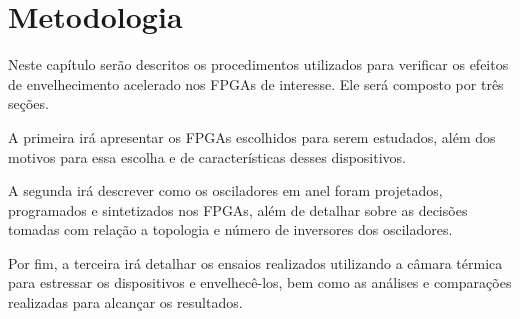 \chapter{Metodologia}
\label{sec:Metodologia}
Neste capítulo serão descritos os procedimentos utilizados para verificar os efeitos de envelhecimento acelerado nos FPGAs de interesse. Ele será composto por três seções.

A primeira irá apresentar os FPGAs escolhidos para serem estudados, além dos motivos para essa escolha e de características desses dispositivos.

A segunda irá descrever como os osciladores em anel foram projetados, programados e sintetizados nos FPGAs, além de detalhar sobre as decisões tomadas com relação a topologia e número de inversores dos osciladores.

Por fim, a terceira irá detalhar os ensaios realizados utilizando a câmara térmica para estressar os dispositivos e envelhecê-los, bem como as análises e comparações realizadas para alcançar os resultados.




